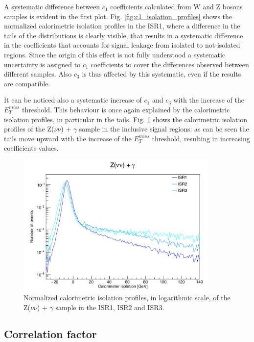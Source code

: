 \documentclass[11pt,a4paper,twoside,openright]{book}
\begin{document}
A systematic difference between $c_{1}$ coefficients calculated from W and Z bosons samples is evident in the first plot. Fig. \ref{fig:c1_isolation_profiles} shows the normalized calorimetric isolation profiles in the ISR1, where a difference in the tails of the distributions is clearly visible, that results in a systematic difference in the coefficients that accounts for signal leakage from isolated to not-isolated regions. Since the origin of this effect is not fully understood a systematic uncertainty is assigned to $c_{1}$ coefficients to cover the differences observed between different samples. Also $c_{3}$ is thus affected by this systematic, even if the results are compatible.

It can be noticed also a systematic increase of $c_{1}$ and $c_{3}$ with the increase of the $E_{T}^{miss}$ threshold. This behaviour is once again explained by the calorimetric isolation profiles, in particular in the tails. Fig. \ref{fig:met_isolation_profiles} shows the calorimetric isolation profiles of the Z($\nu \nu$) + $\gamma$ sample in the inclusive signal regions: as can be seen the tails move upward with the increase of the $E_{T}^{miss}$ threshold, resulting in increasing coefficients values.



\begin{figure}[hbtp!]
    \centering
    \includegraphics[width=10cm]{met_isolation_profiles.pdf}
    \caption{Normalized calorimetric isolation profiles, in logarithmic scale, of the Z($\nu \nu$) + $\gamma$ sample in the ISR1, ISR2 and ISR3.}
    \label{fig:met_isolation_profiles}
\end{figure}


\subsection{Correlation factor}
\end{document}
